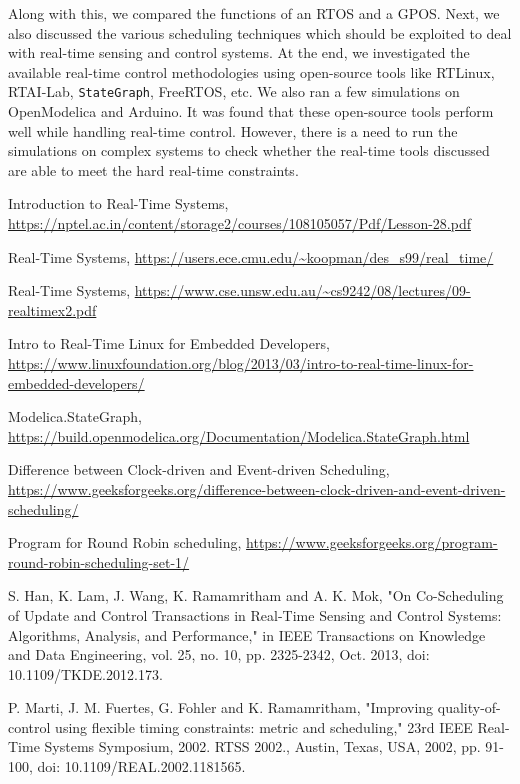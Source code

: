 \documentclass[12pt]{report}
\begin{document}
Along with this, we compared the functions of an RTOS and a GPOS. Next, we also discussed the various scheduling techniques which should be exploited to deal with real-time sensing and control systems. At the end, we investigated the available real-time control methodologies using open-source tools like RTLinux, RTAI-Lab, \texttt{StateGraph}, FreeRTOS, etc. We also ran a few simulations on OpenModelica and Arduino. It was found that these open-source tools perform well while handling real-time control. However, there is a need to run the simulations on complex systems to check whether the real-time tools discussed are able to meet the hard real-time constraints. 

\begin{thebibliography}{111}

Introduction to Real-Time Systems, \url{https://nptel.ac.in/content/storage2/courses/108105057/Pdf/Lesson-28.pdf}

Real-Time Systems, \url{https://users.ece.cmu.edu/~koopman/des_s99/real_time/}

Real-Time Systems, \url{https://www.cse.unsw.edu.au/~cs9242/08/lectures/09-realtimex2.pdf}

Intro to Real-Time Linux for Embedded Developers, \url{https://www.linuxfoundation.org/blog/2013/03/intro-to-real-time-linux-for-embedded-developers/}

Modelica.StateGraph, \url{https://build.openmodelica.org/Documentation/Modelica.StateGraph.html}

Difference between Clock-driven and Event-driven Scheduling, \url{https://www.geeksforgeeks.org/difference-between-clock-driven-and-event-driven-scheduling/}

Program for Round Robin scheduling, \url{https://www.geeksforgeeks.org/program-round-robin-scheduling-set-1/}

S. Han, K. Lam, J. Wang, K. Ramamritham and A. K. Mok, "On Co-Scheduling of Update and Control Transactions in Real-Time Sensing and Control Systems: Algorithms, Analysis, and Performance," in IEEE Transactions on Knowledge and Data Engineering, vol. 25, no. 10, pp. 2325-2342, Oct. 2013, doi: 10.1109/TKDE.2012.173.

P. Marti, J. M. Fuertes, G. Fohler and K. Ramamritham, "Improving quality-of-control using flexible timing constraints: metric and scheduling," 23rd IEEE Real-Time Systems Symposium, 2002. RTSS 2002., Austin, Texas, USA, 2002, pp. 91-100, doi: 10.1109/REAL.2002.1181565.


\end{thebibliography}
\end{document}
